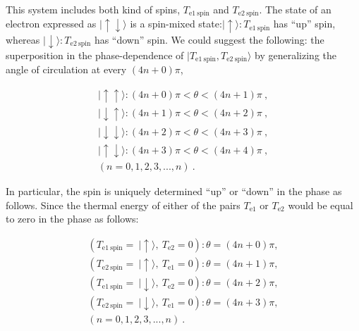 \documentclass[%
 reprint,
 amsmath,amssymb,
 aps,
]{revtex4-1}
\numberwithin{equation}{section}%
\begin{document}
    This system includes both kind of spins, $T_{\mathrm{e1 \ spin}}$ and $T_{\mathrm{e2 \ spin}}$. The state of an electron expressed as $\mid \uparrow \downarrow \rangle$ is a spin-mixed state:$\mid \uparrow \rangle : T_{\mathrm{e1 \ spin}}$ has ``up'' spin, whereas $\mid \downarrow \rangle : T_{\mathrm{e2 \ spin}}$ has ``down'' spin. We could suggest the following: the superposition in the phase-dependence of $\mid T_{\mathrm{e1 \ spin}}, T_{\mathrm{e2 \ spin}} \rangle$ by generalizing the angle of circulation at every $(4n+0)\pi$,

        \begin{equation}
            \begin{split}
                \mid \uparrow  \uparrow \rangle : (4n+0) \pi < \theta < (4n+1)\pi \ , \\
                \mid \downarrow \uparrow \rangle : (4n+1)\pi < \theta < (4n+2)\pi \ , \\
                \mid \downarrow \downarrow \rangle : (4n+2)\pi < \theta < (4n+3)\pi \ , \\
                \mid \uparrow \downarrow \rangle : (4n+3)\pi < \theta < (4n+4)\pi \ , \\
                (n=0,1,2,3,...,n)
                \ .
            \end{split}
            \label{e3_spin_Te1_Te2}
        \end{equation}

    In particular, the spin is uniquely determined ``up'' or ``down'' in the phase as follows. Since the thermal energy of either of the pairs $T_{\mathrm{e1}}$ or $T_{\mathrm{e2}}$ would be equal to zero in the phase as follows:

        \begin{equation}
            \begin{split}
                (T_{\mathrm{e1 \ spin}} = \ \mid \uparrow  \rangle , \ T_{\mathrm{e2}} = 0) : \theta = (4n+0) \pi , \\
                (T_{\mathrm{e2 \ spin}} = \ \mid \uparrow  \rangle, \ T_{\mathrm{e1}} = 0)  : \theta = (4n+1) \pi , \\
                (T_{\mathrm{e1 \ spin}} = \ \mid \downarrow  \rangle , \ T_{\mathrm{e2}} = 0) : \theta = (4n+2) \pi , \\
                (T_{\mathrm{e2 \ spin}} = \ \mid \downarrow  \rangle, \ T_{\mathrm{e1}} = 0)  : \theta = (4n+3) \pi , \\
                (n=0,1,2,3,...,n)
                \ .
            \end{split}
            \label{e3_spin_Te1_Te2_fixed}
        \end{equation}
\end{document}
